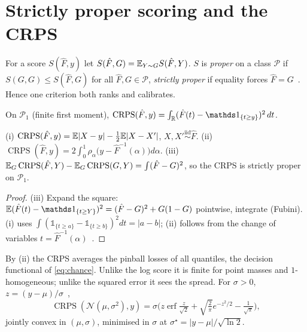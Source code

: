\documentclass[10pt,twocolumn]{article}
\newcommand{\Norm}{\mathcal N}
\newcommand{\CRPS}{\operatorname{CRPS}}
\newcommand{\erf}{\operatorname{erf}}
\newcommand{\ind}[1]{\mathds 1_{\{#1\}}}
\begin{document}
\section{Strictly proper scoring and the CRPS}
For a score $S(\hat F,y)$ let $S(\hat F,G)=\mathbb{E}_{Y\sim G}S(\hat F,Y)$. $S$ is \emph{proper} on a class $\mathcal P$ if $S(G,G)\le S(\hat F,G)$ for all $\hat F,G\in\mathcal P$, \emph{strictly proper} if equality forces $\hat F=G$~\cite{gneiting2007}. Hence one criterion both ranks and calibrates.
\begin{definition}
On $\mathcal P_1$ (finite first moment),
$\CRPS(\hat F,y)=\int_\R(\hat F(t)-\ind{t\ge y})^2\,dt$.
\end{definition}
\begin{theorem}\label{th:crps}
(i) $\CRPS(\hat F,y)=\E|X-y|-\tfrac12\E|X-X'|$, $X,X'\overset{\mathrm{iid}}\sim\hat F$.
(ii) $\CRPS(\hat F,y)=2\int_0^1\rho_\alpha\big(y-\hat F^{-1}(\alpha)\big)d\alpha$.
(iii) $\E_G\CRPS(\hat F,Y)-\E_G\CRPS(G,Y)=\int(\hat F-G)^2$, so the CRPS is strictly proper on $\mathcal P_1$.
\end{theorem}
\begin{proof}
(iii) Expand the square: $\E(\hat F(t)-\ind{t\ge Y})^2=(\hat F-G)^2+G(1-G)$ pointwise, integrate (Fubini). (i) uses $\int(\ind{t\ge a}-\ind{t\ge b})^2dt=|a-b|$; (ii) follows from the change of variables $t=\hat F^{-1}(\alpha)$~\cite{gneiting2011}.
\end{proof}
By (ii) the CRPS averages the pinball losses of all quantiles, the decision functional of \eqref{eq:chance}. Unlike the log score it is finite for point masses and $1$-homogeneous; unlike the squared error it sees the spread. For $\sigma>0$, $z=(y-\mu)/\sigma$~\cite{jordan2019},
\begin{equation}\label{eq:gcrps}
\CRPS(\Norm(\mu,\sigma^2),y)=\sigma\Big(z\erf\tfrac{z}{\sqrt2}+\sqrt{\tfrac2\pi}e^{-z^2/2}-\tfrac1{\sqrt\pi}\Big),
\end{equation}
jointly convex in $(\mu,\sigma)$, minimised in $\sigma$ at $\sigma^\star=|y-\mu|/\sqrt{\ln2}$.
\end{document}
